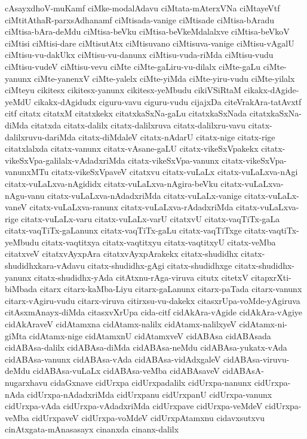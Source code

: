 {cAsayxdhoV-muKamf
ciMke-modalAdavu
ciMtata-mAterxVNa
ciMtayeVtf
ciMtitAthaR-parxsAdhanamf
ciMtisada-vanige
ciMtisade
ciMtisa-bAradu
ciMtisa-bAra-deMdu
ciMtisa-beVku
ciMtisa-beVkeMdalalxve
ciMtisa-beVkoV
ciMtisi
ciMtisi-dare
ciMtisutAtx
ciMtisuvano
ciMtisuva-vanige
ciMtisu-vAgalU
ciMtisu-vu-dakUkx
ciMtisu-vu-danunx
ciMtisu-vuda-riMda
ciMtisu-vudu
ciMtisu-vudeV
ciMtisu-vevu
ciMte
ciMte-gaLiru-vu-dilalx
ciMte-gaLu
ciMte-yanunx
ciMte-yanenxV
ciMte-yalelx
ciMte-yiMda
ciMte-yiru-vudu
ciMte-yilalx
ciMteyu
cikitesx
cikitesx-yanunx
cikitesx-yeMbudu
cikiVSiRtaM
cikakx-dAgide-yeMdU
cikakx-dAgidudx
ciguru-vavu
ciguru-vudu
cijajxDa
citeVrakAra-tatAvxtf
citf
citatx
citatxM
citatxkekx
citatxkaSxNa-gaLu
citatxkaSxNada
citatxkaSxNa-diMda
citatxda
citatx-dalilx
citatx-dalilxruva
citatx-dalilxru-vavu
citatx-dalilxruvu-dariMda
citatx-diMdaleV
citatx-nAdarU
citatx-nige
citatx-rige
citatxlalxda
citatx-vanunx
citatx-vAsane-gaLU
citatx-vikeSxVpakekx
citatx-vikeSxVpa-galilalx-vAdadxriMda
citatx-vikeSxVpa-vanunx
citatx-vikeSxVpa-vanunxMTu
citatx-vikeSxVpaveV
citatxvu
citatx-vuLaLx
citatx-vuLaLxva-nAgi
citatx-vuLaLxva-nAgididx
citatx-vuLaLxva-nAgira-beVku
citatx-vuLaLxva-nAgu-vanu
citatx-vuLaLxva-nAdadxriMda
citatx-vuLaLx-vanige
citatx-vuLaLx-vaneV
citatx-vuLaLxva-ranunx
citatx-vuLaLxva-rAdadxriMda
citatx-vuLaLxva-rige
citatx-vuLaLx-varu
citatx-vuLaLx-varU
citatxvU
citatx-vaqTiTx-gaLa
citatx-vaqTiTx-gaLanunx
citatx-vaqTiTx-gaLu
citatx-vaqTiTxge
citatx-vaqtiTx-yeMbudu
citatx-vaqtitxya
citatx-vaqtitxyu
citatx-vaqtitxyU
citatx-veMba
citatxveV
citatxvAyxpAra
citatxvAyxpArakekx
citatx-shudidhx
citatx-shudidhxkara-vAdavu
citatx-shudidhx-gAgi
citatx-shudidhxge
citatx-shudidhx-yanunx
citatx-shudidhx-yAda
citAtxnu-rAga-viruva
citutx
citetxV
citapxrXti-biMbada
citarx
citarx-kaMba-Liyu
citarx-gaLanunx
citarx-paTada
citarx-vanunx
citarx-vAgiru-vudu
citarx-viruva
citirxsu-vu-dakekx
citasxrUpa-voMde-yAgiruva
citAsxmAnayx-diMda
citasxvXrUpa
cida-citf
cidAkAra-vAgide
cidAkAra-vAgiye
cidAkAraveV
cidAtamxna
cidAtamx-nalilx
cidAtamx-nalilxyeV
cidAtamx-ni-giMta
cidAtamx-nige
cidAtamxnU
cidAtamxveV
cidABAsa
cidABAsada
cidABAsa-dalilx
cidABAsa-diMda
cidABAsa-neMdu
cidABAsa-yukatx-vAda
cidABAsa-vanunx
cidABAsa-vAda
cidABAsa-vidAdxgaleV
cidABAsa-viruvu-deMdu
cidABAsa-vuLaLx
cidABAsa-veMba
cidABAsaveV
cidABAsA-nugarxhavu
cidaGxnave
cidUrxpa
cidUrxpadalilx
cidUrxpa-nanunx
cidUrxpa-nAda
cidUrxpa-nAdadxriMda
cidUrxpanu
cidUrxpanU
cidUrxpa-vanunx
cidUrxpa-vAda
cidUrxpa-vAdadxriMda
cidUrxpave
cidUrxpa-veMdeV
cidUrxpa-veMba
cidUrxpaveV
cidUrxpa-voMdeV
cidUrxpAtamxnu
cidavxsutxvu
cinAtxgata-mAnasasayx
cinanxda
cinanx-dalilx
}
